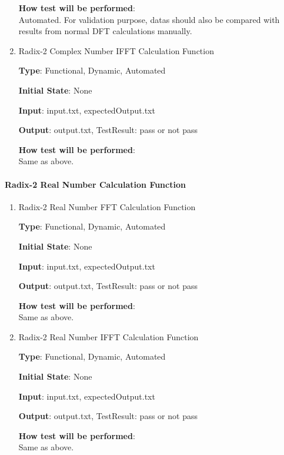 \documentclass[12pt, titlepage]{article}
\begin{document}
\begin{enumerate}
\textbf {How test will be performed}: \\
Automated.
For validation purpose, datas should also be compared with results from normal DFT calculations manually.

\item{Radix-2 Complex Number IFFT Calculation Function\\}

\textbf {Type}: Functional, Dynamic, Automated
					
\textbf {Initial State}: None
					
\textbf {Input}: input.txt, expectedOutput.txt
					
\textbf {Output}:  output.txt, TestResult: pass or not pass

\textbf {How test will be performed}: \\
Same as above.
\end{enumerate}

					
\paragraph{Radix-2 Real Number Calculation Function\\}

\begin{enumerate}

\item{Radix-2 Real Number FFT Calculation Function\\}

\textbf {Type}: Functional, Dynamic, Automated
					
\textbf {Initial State}: None
					
\textbf {Input}: input.txt, expectedOutput.txt
					
\textbf {Output}:  output.txt, TestResult: pass or not pass
					
\textbf {How test will be performed}: \\
Same as above.

\item{Radix-2 Real Number IFFT Calculation Function\\}

\textbf {Type}: Functional, Dynamic, Automated
					
\textbf {Initial State}: None
					
\textbf {Input}: input.txt, expectedOutput.txt
					
\textbf {Output}:  output.txt, TestResult: pass or not pass

\textbf {How test will be performed}: \\
Same as above.
\end{enumerate}
\end{document}
